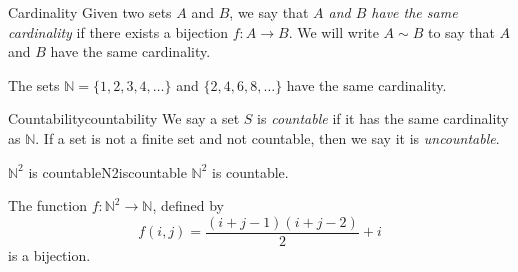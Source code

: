 \begin{defn}{Cardinality}{}
Given two sets \(A\) and \(B\), we say that \emph{\(A\) and \(B\) have the same cardinality} if there exists a bijection \(f\colon A \to B\). We will write \(A \sim B\) to say that \(A\) and \(B\) have the same cardinality.
\end{defn}

\begin{exmp}{}{}
	The sets \(\mathbb{N} = \{1, 2, 3, 4, \dots\}\) and \(\{2, 4, 6, 8, \dots\}\) have the same cardinality.
\end{exmp}

\begin{defn}{Countability}{countability}
	We say a set \(S\) is \emph{countable} if it has the same cardinality as \(\mathbb{N}\). If a set is not a finite set and not countable, then we say it is \emph{uncountable}.
\end{defn}

\begin{prop}{\(\mathbb{N}^2\) is countable}{N2iscountable}
	\(\mathbb{N}^2\) is countable.
\end{prop}


\begin{dem}{}{}
	The function \(f\colon \mathbb{N}^2 \to \mathbb{N}\), defined by \[
		f(i, j) = \frac{(i + j - 1)(i + j - 2)}{2} + i
	\]
	is a bijection.
\end{dem}
